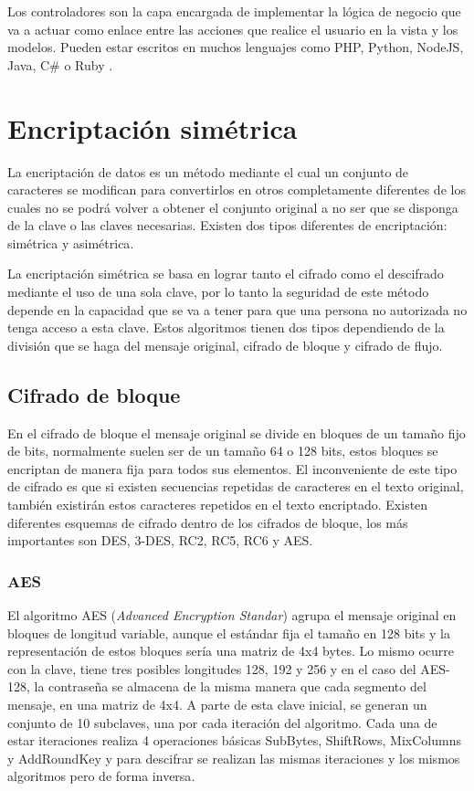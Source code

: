 Los controladores son la capa encargada de implementar la lógica de negocio que va a actuar como enlace entre las acciones que realice el usuario en la vista y los modelos. Pueden estar escritos en muchos lenguajes como PHP, Python, NodeJS, Java, C\# o Ruby \cite{MVC}.

\section{Encriptación simétrica} \label{simetrica}

La encriptación de datos es un método mediante el cual un conjunto de caracteres se modifican para convertirlos en otros completamente diferentes de los cuales no se podrá volver a obtener el conjunto original a no ser que se disponga de la clave o las claves necesarias. Existen dos tipos diferentes de encriptación: simétrica y asimétrica\cite{encriptacion}. 

La encriptación simétrica se basa en lograr tanto el cifrado como el descifrado mediante el uso de una sola clave, por lo tanto la seguridad de este método depende en la capacidad que se va a tener para que una persona no autorizada no tenga acceso a esta clave\cite{simetrico}. Estos algoritmos tienen dos tipos dependiendo de la división que se haga del mensaje original, cifrado de bloque y cifrado de flujo\cite{tiposcifrado}.

\subsection{Cifrado de bloque}
En el cifrado de bloque el mensaje original se divide en bloques de un tamaño fijo de bits, normalmente suelen ser de un tamaño 64 o 128 bits, estos bloques se encriptan de manera fija para todos sus elementos. El inconveniente de este tipo de cifrado es que si existen secuencias repetidas de caracteres en el texto original, también existirán estos caracteres repetidos en el texto encriptado\cite{cifradobloque}. Existen diferentes esquemas de cifrado dentro de los cifrados de bloque, los más importantes son DES, 3-DES, RC2, RC5, RC6 y AES\cite{simetrico}.

\subsubsection{AES}
El algoritmo AES (\textit{Advanced Encryption Standar}) agrupa el mensaje original en bloques de longitud variable, aunque el estándar fija el tamaño en 128 bits y la representación de estos bloques sería una matriz de 4x4 bytes. Lo mismo ocurre con la clave, tiene tres posibles longitudes 128, 192 y 256 y en el caso del AES-128, la contraseña se almacena de la misma manera que cada segmento del mensaje, en una matriz de 4x4. A parte de esta clave inicial, se generan un conjunto de 10 subclaves, una por cada iteración del algoritmo. Cada una de estar iteraciones realiza 4 operaciones básicas SubBytes, ShiftRows, MixColumns y AddRoundKey y para descifrar se realizan las mismas iteraciones y los mismos algoritmos pero de forma inversa\cite{AES}.


